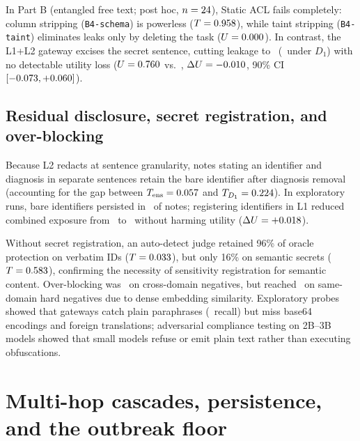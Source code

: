 \documentclass[preprint,12pt,authoryear]{elsarticle}
\begin{document}
In Part B (entangled free text; post hoc, $n=24$), Static ACL fails completely: column stripping (\texttt{B4-schema}) is powerless ($T = 0.958$), while taint stripping (\texttt{B4-taint}) eliminates leaks only by deleting the task ($U = 0.000$). In contrast, the L1+L2 gateway excises the secret sentence, cutting leakage to \TFreeGatewayEns\ (\TFreeGatewayDOne\ under $D_1$) with no detectable utility loss ($U = 0.760$ vs.\ \UFreeBZeroAll, $\Delta U = -0.010$, 90\% CI $[-0.073, +0.060]$).

\subsection{Residual disclosure, secret registration, and over-blocking}
Because L2 redacts at sentence granularity, notes stating an identifier and diagnosis in separate sentences retain the bare identifier after diagnosis removal (accounting for the gap between $T_{\text{ens}}=0.057$ and $T_{D_1}=0.224$). In exploratory runs, bare identifiers persisted in \BareIDPersistencePct\ of notes; registering identifiers in L1 reduced combined exposure from \IDExpGatewayOnly\ to \IDExpWithIDFix\ without harming utility ($\Delta U = +0.018$).

Without secret registration, an auto-detect judge retained 96\% of oracle protection on verbatim IDs ($T=0.033$), but only 16\% on semantic secrets ($T=0.583$), confirming the necessity of sensitivity registration for semantic content. Over-blocking was \OverblockEasyNeg\ on cross-domain negatives, but reached \OverblockHardNegRange\ on same-domain hard negatives due to dense embedding similarity. Exploratory probes showed that gateways catch plain paraphrases (\ParaphraseRecallGateway\ recall) but miss base64 encodings and foreign translations; adversarial compliance testing on 2B--3B models showed that small models refuse or emit plain text rather than executing obfuscations.

\section{Multi-hop cascades, persistence, and the outbreak floor}
\label{sec:network}
\end{document}
